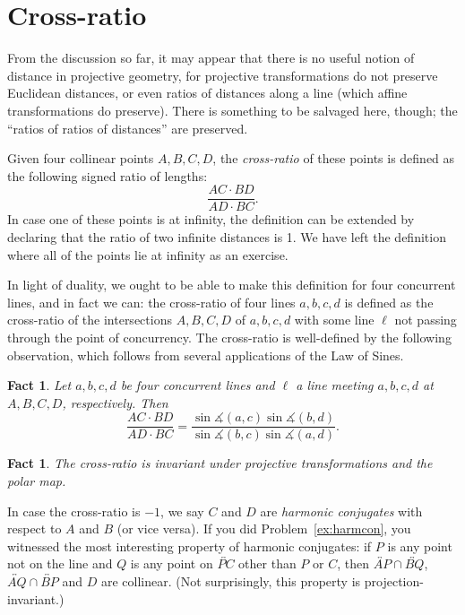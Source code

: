 \documentclass[12pt]{book}
\numberwithin{exc}{section}
\numberwithin{figure}{section}
\newtheorem{fact}[theorem]{Fact}
\numberwithin{equation}{theorem}
\def\dang{\measuredangle} %
\def\line#1{\overleftrightarrow{#1}}
\begin{document}
\section{Cross-ratio}
\label{sec:cross-ratio}

From the discussion so far, it may appear that there is no useful 
notion of distance in projective geometry, for projective 
transformations do not preserve Euclidean distances, or even ratios of 
distances along a line (which affine transformations do preserve).
There is something to be salvaged here, though; the ``ratios of 
ratios of distances'' are preserved.

Given four collinear points $A,B,C,D$, the \emph{cross-ratio}
  of these 
points is defined as the following signed ratio of lengths:
\[
\frac{AC \cdot BD}{AD \cdot BC}.
\]
In case one of these points is at infinity, the definition can be 
extended by declaring that the ratio of two infinite distances is 1. 
We have left the definition where all of the points lie at infinity as an 
exercise.

In light of duality, we ought to be able to make this definition for 
four concurrent lines, and in fact we can: the cross-ratio of four 
lines $a,b,c,d$ is defined as the cross-ratio of the intersections 
$A,B,C,D$ of $a,b,c,d$ with some line $\ell$ not passing through the point 
of concurrency. 
The cross-ratio is well-defined by the following observation,
which follows from several applications of the Law of Sines.
\begin{fact}
Let $a, b, c, d$ be four concurrent lines and $\ell$ a line meeting
$a, b, c, d$ at $A, B, C, D$, respectively. Then 
\[
\frac{AC \cdot BD}{AD \cdot BC} = \frac{\sin \dang(a, c) \sin \dang(b,
d)}{\sin \dang(b, c) \sin \dang(a, d)}.
\]
\end{fact}

\begin{fact}
The cross-ratio is invariant under projective transformations and the 
polar map.
\end{fact}

In case the cross-ratio is $-1$, we say $C$ and $D$ are \emph{harmonic 
conjugates} 
with respect to $A$ and $B$ (or vice versa). If you did 
Problem~\ref{ex:harmcon},
you witnessed the most interesting property of harmonic 
conjugates: if $P$ is any point not on the line and $Q$ is any point 
on $\line{PC}$
other than $P$ or $C$, then $\line{AP} \cap \line{BQ}$, $\line{AQ} \cap 
\line{BP}$ and $D$ are
collinear. (Not surprisingly, this property is projection-invariant.)
\end{document}

